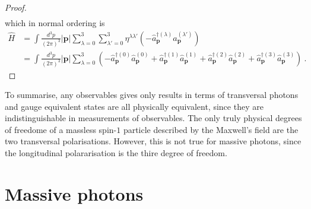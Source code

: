 \begin{proof}
\begin{equation*}
\begin{aligned}
        \end{aligned}
        \end{equation*}
        which in normal ordering is 
        \begin{equation*}
        \begin{aligned}
            \hat H & = \int \frac{d^3 p}{(2\pi)^3} |\mathbf p| \sum_{\lambda=0}^{3} \sum_{\lambda'=0}^{3} \eta^{\lambda \lambda'} (- \hat a_{\mathbf p}^{\dagger (\lambda)} \hat a_{\mathbf p}^{(\lambda')}) \\ & = \int \frac{d^3 p}{(2\pi)^3} |\mathbf p| \sum_{\lambda=0}^{3} (- \hat a_{\mathbf p}^{\dagger (0)} \hat a_{\mathbf p}^{(0)} + \hat a_{\mathbf p}^{\dagger (1)} \hat a_{\mathbf p}^{(1)} + \hat a_{\mathbf p}^{\dagger (2)} \hat a_{\mathbf p}^{(2)}+ \hat a_{\mathbf p}^{\dagger (3)} \hat a_{\mathbf p}^{(3)}) ~.
        \end{aligned}
        \end{equation*}
    \end{proof}

    To summarise, any observables gives only results in terms of transversal photons and gauge equivalent states are all physically equivalent, since they are indistinguishable in measurements of observables. The only truly physical degrees of freedome of a massless spin-$1$ particle described by the Maxwell's field are the two transversal polarisations. However, this is not true for massive photons, since the longitudinal polararisation is the thire degree of freedom.

\section{Massive photons}    

